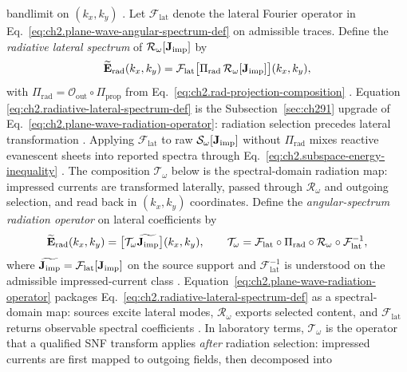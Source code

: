 bandlimit on \((k_x,k_y)\) \cite{devaney2004}.
Let \(\mathcal{F}_{\mathrm{lat}}\) denote the lateral Fourier operator in
Eq.~\eqref{eq:ch2.plane-wave-angular-spectrum-def} on admissible traces. Define the
\emph{radiative lateral spectrum} of \(\mathcal{R}_\omega[\mathbf{J}_{\mathrm{imp}}]\) by
\begin{equation}
\label{eq:ch2.radiative-lateral-spectrum-def}
\widetilde{\mathbf{E}}_{\mathrm{rad}}(k_x,k_y)
=
\mathcal{F}_{\mathrm{lat}}\big[\Pi_{\mathrm{rad}}\,\mathcal{R}_\omega[\mathbf{J}_{\mathrm{imp}}]\big](k_x,k_y),
\end{equation}
with \(\Pi_{\mathrm{rad}}=\mathcal{O}_{\mathrm{out}}\circ\Pi_{\mathrm{prop}}\) from
Eq.~\eqref{eq:ch2.rad-projection-composition} \cite{stratton1941}. Equation
\eqref{eq:ch2.radiative-lateral-spectrum-def} is the Subsection~\ref{sec:ch291} upgrade of
Eq.~\eqref{eq:ch2.plane-wave-radiation-operator}: radiation selection precedes
lateral transformation \cite{stratton1941}. Applying \(\mathcal{F}_{\mathrm{lat}}\) to raw
\(\mathcal{S}_\omega[\mathbf{J}_{\mathrm{imp}}]\) without \(\Pi_{\mathrm{rad}}\) mixes reactive evanescent sheets
into reported spectra through Eq.~\eqref{eq:ch2.subspace-energy-inequality}
\cite{harrington2001}.
The composition \(\mathcal{T}_\omega\) below is the spectral-domain radiation map: impressed
currents are transformed laterally, passed through \(\mathcal{R}_\omega\) and outgoing
selection, and read back in \((k_x,k_y)\) coordinates. Define the \emph{angular-spectrum
radiation operator} on lateral coefficients by
\begin{equation}
\label{eq:ch2.plane-wave-radiation-operator}
\widetilde{\mathbf{E}}_{\mathrm{rad}}(k_x,k_y)
=
\big[\mathcal{T}_\omega\widetilde{\mathbf{J}_{\mathrm{imp}}}\big](k_x,k_y),
\qquad
\mathcal{T}_\omega
=
\mathcal{F}_{\mathrm{lat}}\circ\Pi_{\mathrm{rad}}\circ\mathcal{R}_\omega\circ\mathcal{F}_{\mathrm{lat}}^{-1},
\end{equation}
where \(\widetilde{\mathbf{J}_{\mathrm{imp}}}=\mathcal{F}_{\mathrm{lat}}[\mathbf{J}_{\mathrm{imp}}]\) on the source support and
\(\mathcal{F}_{\mathrm{lat}}^{-1}\) is understood on the admissible impressed-current class
\cite{stratton1941}. Equation~\eqref{eq:ch2.plane-wave-radiation-operator}
packages Eq.~\eqref{eq:ch2.radiative-lateral-spectrum-def} as a spectral-domain map: sources
excite lateral modes, \(\mathcal{R}_\omega\) exports selected content, and \(\mathcal{F}_{\mathrm{lat}}\)
returns observable spectral coefficients \cite{stratton1941}. In laboratory terms,
\(\mathcal{T}_\omega\) is the operator that a qualified SNF transform applies \emph{after}
radiation selection: impressed currents are first mapped to outgoing fields, then decomposed into
